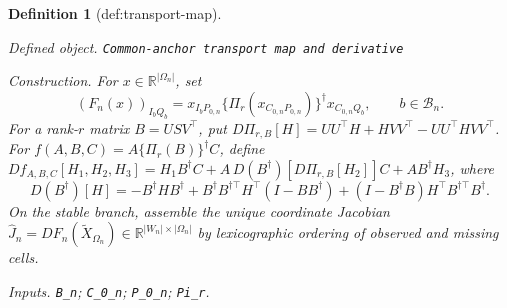 \documentclass{article}
\newtheorem{definition}{Definition}
\begin{document}
\begin{definition}[def:transport-map]\label{def:transport-map}
\par\smallskip\noindent\emph{Defined object.} \texttt{Common-\allowbreak{}anchor transport map and derivative}
\par\smallskip\noindent\emph{Construction.} For \(x\in\mathbb R^{|\Omega_n|}\), set \[(F_n(x))_{I_bQ_b}=x_{I_bP_{0,n}}\{\Pi_r(x_{C_{0,n}P_{0,n}})\}^{\dagger}x_{C_{0,n}Q_b},\qquad b\in\mathcal B_n.\] For a rank-\(r\) matrix \(B=USV^{\top}\), put \(D\Pi_{r,B}[H]=UU^{\top}H+HVV^{\top}-UU^{\top}HVV^{\top}\). For \(f(A,B,C)=A\{\Pi_r(B)\}^{\dagger}C\), define \(Df_{A,B,C}[H_1,H_2,H_3]=H_1B^{\dagger}C+A\,D(B^{\dagger})[D\Pi_{r,B}[H_2]]C+AB^{\dagger}H_3\), where \[D(B^{\dagger})[H]=-B^{\dagger}HB^{\dagger}+B^{\dagger}B^{\dagger\top}H^{\top}(I-BB^{\dagger})+(I-B^{\dagger}B)H^{\top}B^{\dagger\top}B^{\dagger}.\] On the stable branch, assemble the unique coordinate Jacobian \(\widehat J_n=DF_n(\widetilde X_{\Omega_n})\in\mathbb R^{|W_n|\times|\Omega_n|}\) by lexicographic ordering of observed and missing cells.
\par\smallskip\noindent\emph{Inputs.} \texttt{B\_\allowbreak{}n}; \texttt{C\_\allowbreak{}0\_\allowbreak{}n}; \texttt{P\_\allowbreak{}0\_\allowbreak{}n}; \texttt{Pi\_\allowbreak{}r}.
\end{definition}
\end{document}
